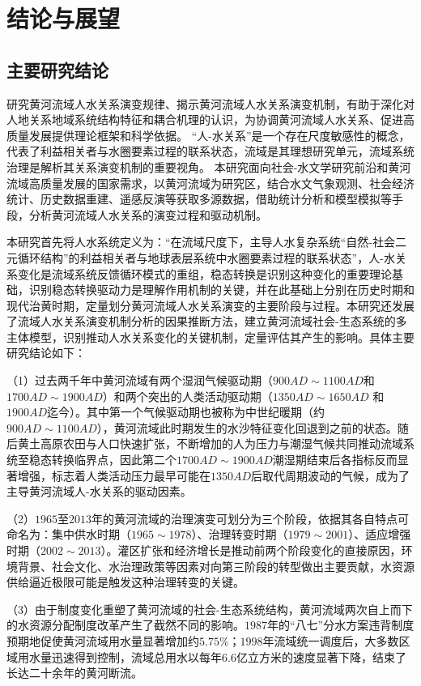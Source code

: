 \chapter{结论与展望}

\section{主要研究结论}

研究黄河流域人水关系演变规律、揭示黄河流域人水关系演变机制，有助于深化对人地关系地域系统结构特征和耦合机理的认识，为协调黄河流域人水关系、促进高质量发展提供理论框架和科学依据。
“人-水关系”是一个存在尺度敏感性的概念，代表了利益相关者与水圈要素过程的联系状态，流域是其理想研究单元，流域系统治理是解析其关系演变机制的重要视角。
本研究面向社会-水文学研究前沿和黄河流域高质量发展的国家需求，以黄河流域为研究区，结合水文气象观测、社会经济统计、历史数据重建、遥感反演等获取多源数据，借助统计分析和模型模拟等手段，分析黄河流域人水关系的演变过程和驱动机制。

本研究首先将人水系统定义为：“在流域尺度下，主导人水复杂系统“自然-社会二元循环结构”的利益相关者与地球表层系统中水圈要素过程的联系状态”，人-水关系变化是流域系统反馈循环模式的重组，稳态转换是识别这种变化的重要理论基础，识别稳态转换驱动力是理解作用机制的关键，并在此基础上分别在历史时期和现代治黄时期，定量划分黄河流域人水关系演变的主要阶段与过程。本研究还发展了流域人水关系演变机制分析的因果推断方法，建立黄河流域社会-生态系统的多主体模型，识别推动人水关系变化的关键机制，定量评估其产生的影响。具体主要研究结论如下：

（1）过去两千年中黄河流域有两个湿润气候驱动期（$900AD\sim1100AD$和$1700AD\sim1900AD$）和两个突出的人类活动驱动期（$1350AD \sim 1650AD$ 和 $1900AD$迄今）。其中第一个气候驱动期也被称为中世纪暖期（约$900AD \sim 1100AD$），黄河流域此时期发生的水沙特征变化回退到之前的状态。随后黄土高原农田与人口快速扩张，不断增加的人为压力与潮湿气候共同推动流域系统至稳态转换临界点，因此第二个$1700AD \sim 1900AD$潮湿期结束后各指标反而显著增强，标志着人类活动压力最早可能在$1350AD$后取代周期波动的气候，成为了主导黄河流域人-水关系的驱动因素。

（2）$1965$至$2013$年的黄河流域的治理演变可划分为三个阶段，依据其各自特点可命名为：集中供水时期（$1965 \sim 1978$）、治理转变时期（$1979 \sim 2001$）、适应增强时期（$2002 \sim 2013$）。灌区扩张和经济增长是推动前两个阶段变化的直接原因，环境背景、社会文化、水治理政策等因素对向第三阶段的转型做出主要贡献，水资源供给逼近极限可能是触发这种治理转变的关键。

（3）由于制度变化重塑了黄河流域的社会-生态系统结构，黄河流域两次自上而下的水资源分配制度改革产生了截然不同的影响。$1987$年的“八七”分水方案违背制度预期地促使黄河流域用水量显著增加约$5.75\%$；$1998$年流域统一调度后，大多数区域用水量迅速得到控制，流域总用水以每年$6.6$亿立方米的速度显著下降，结束了长达二十余年的黄河断流。

